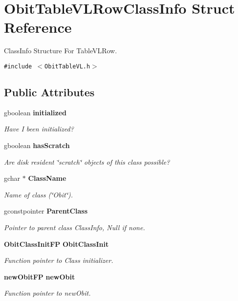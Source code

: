 \section{Obit\-Table\-VLRow\-Class\-Info Struct Reference}
\label{structObitTableVLRowClassInfo}
Class\-Info Structure For Table\-VLRow.  


{\tt \#include $<$Obit\-Table\-VL.h$>$}

\subsection*{Public Attributes}
\begin{CompactItemize}
\item 
gboolean {\bf initialized}
\begin{CompactList}\small\item\em Have I been initialized? \item\end{CompactList}\item 
gboolean {\bf has\-Scratch}
\begin{CompactList}\small\item\em Are disk resident \char`\"{}scratch\char`\"{} objects of this class possible? \item\end{CompactList}\item 
gchar $\ast$ {\bf Class\-Name}
\begin{CompactList}\small\item\em Name of class (\char`\"{}Obit\char`\"{}). \item\end{CompactList}\item 
gconstpointer {\bf Parent\-Class}
\begin{CompactList}\small\item\em Pointer to parent class Class\-Info, Null if none. \item\end{CompactList}\item 
{\bf Obit\-Class\-Init\-FP} {\bf Obit\-Class\-Init}
\begin{CompactList}\small\item\em Function pointer to Class initializer. \item\end{CompactList}\item 
{\bf new\-Obit\-FP} {\bf new\-Obit}
\begin{CompactList}\small\item\em Function pointer to new\-Obit. \item\end{CompactList}\item 

\end{CompactItemize}
